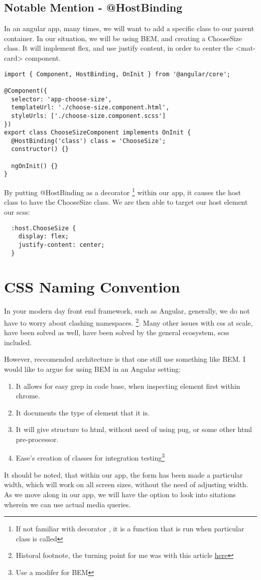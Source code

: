 \subsection{ Notable Mention - @HostBinding }
In an angular app, many times, we will want to add a specific class to our
parent container. In our situation, we will be using BEM, and creating a
ChooseSize class. It will implement flex, and use justify content, in order to
center the <mat-card> component.

\begin{lstlisting}[caption=My Javascript Example]
import { Component, HostBinding, OnInit } from '@angular/core';

@Component({
  selector: 'app-choose-size',
  templateUrl: './choose-size.component.html',
  styleUrls: ['./choose-size.component.scss']
})
export class ChooseSizeComponent implements OnInit {
  @HostBinding('class') class = 'ChooseSize';
  constructor() {}

  ngOnInit() {}
}
\end{lstlisting}

By putting @HostBinding as a decorator \footnote{If not familiar with decorator
, it is a function that is run when particular class is called} within our app,
it causes the host class to have the ChooseSize class. We are then able to
target our host element our scss:
\begin{verbatim}
  :host.ChooseSize {
    display: flex;
    justify-content: center;
  }
\end{verbatim}

\section{ CSS Naming Convention }
In your modern day front end framework, such as Angular, generally, we do not
have to worry about clashing namespaces. \footnote{Historal footnote, the
turning point for me was with this article \href{https://glenmaddern.com/articles/css-modules}{here}}.
Many other issues with css at scale, have been solved as well, have been 
solved by the general ecosystem, scss included.

However, reccomended architecture is that one still use something like BEM. I
would like to argue for using BEM in an Angular setting:
\begin{enumerate}
  \item It allows for easy grep in code base, when inspecting element first
  within chrome.
  \item It documents the type of element that it is.
  \item It will give structure to html, without need of using pug, or some other
  html pre-processor.
  \item Ease's creation of classes for integration testing\footnote{Use a modifer
  for BEM}
\end{enumerate}

It should be noted, that within our app, the form has been made a particular
width, which will work on all screen sizes, without the need of adjusting width.
As we move along in our app, we will have the option to look into sitations
wherein we can use actual media queries.
